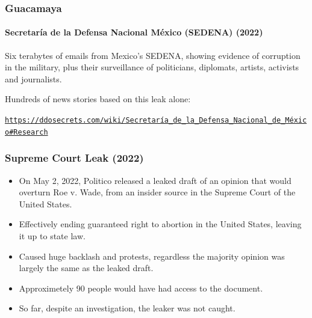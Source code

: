 \documentclass[aspectratio=169,usenames,dvipsnames]{beamer}
\begin{document}
\begin{frame}[c]
  \frametitle{Guacamaya}
  \framesubtitle{Secretaría de la Defensa Nacional México (SEDENA) (2022)}

  Six terabytes of emails from Mexico's SEDENA, showing evidence of corruption
  in the military, plus their surveillance of politicians, diplomats, artists,
  activists and journalists.

  \vspace{5mm}

  Hundreds of news stories based on this leak alone:

  \vspace{5mm}

  \centering
  \scriptsize
  \href{https://ddosecrets.com/wiki/Secretar\%C3\%ADa_de_la_Defensa_Nacional_de_M\%C3\%A9xico\#Research}{\texttt{https://ddosecrets.com/wiki/Secretaría\_de\_la\_Defensa\_Nacional\_de\_México\#Research}}

\end{frame}

\begin{frame}
  \frametitle{Supreme Court Leak (2022)}

  \begin{itemize}[<+->]
    \item On May 2, 2022, Politico released a leaked draft of an opinion
      that would overturn Roe v. Wade, from an insider source in the Supreme
      Court of the United States.
    \item Effectively ending guaranteed right to abortion in the United
      States, leaving it up to state law.
    \item Caused huge backlash and protests, regardless the majority opinion
      was largely the same as the leaked draft.
    \item Approximetely 90 people would have had access to the document.
    \item So far, despite an investigation, the leaker was not caught.
  \end{itemize}

\end{frame}
\end{document}
